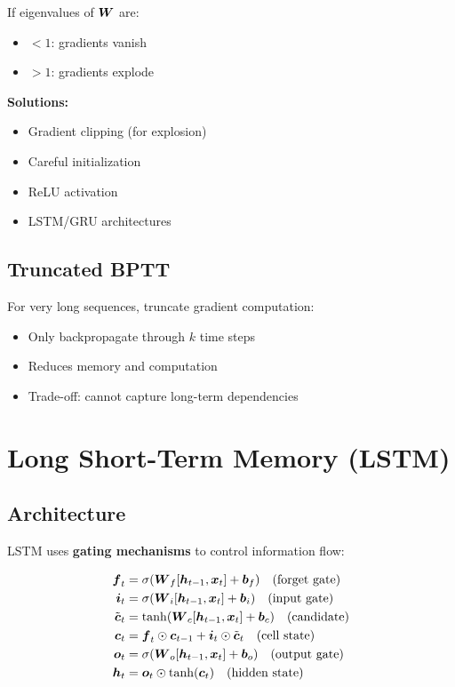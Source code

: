 If eigenvalues of $\boldsymbol{W}$ are:
\begin{itemize}
    \item $< 1$: gradients vanish
    \item $> 1$: gradients explode
\end{itemize}

\textbf{Solutions:}
\begin{itemize}
    \item Gradient clipping (for explosion)
    \item Careful initialization
    \item ReLU activation
    \item LSTM/GRU architectures
\end{itemize}

\subsection{Truncated BPTT}

For very long sequences, truncate gradient computation:
\begin{itemize}
    \item Only backpropagate through $k$ time steps
    \item Reduces memory and computation
    \item Trade-off: cannot capture long-term dependencies
\end{itemize}

\section{Long Short-Term Memory (LSTM)}
\label{sec:lstm}

\subsection{Architecture}

LSTM uses \textbf{gating mechanisms} to control information flow:

\begin{align}
\boldsymbol{f}_t &= \sigma(\boldsymbol{W}_f [\boldsymbol{h}_{t-1}, \boldsymbol{x}_t] + \boldsymbol{b}_f) \quad \text{(forget gate)} \\
\boldsymbol{i}_t &= \sigma(\boldsymbol{W}_i [\boldsymbol{h}_{t-1}, \boldsymbol{x}_t] + \boldsymbol{b}_i) \quad \text{(input gate)} \\
\tilde{\boldsymbol{c}}_t &= \tanh(\boldsymbol{W}_c [\boldsymbol{h}_{t-1}, \boldsymbol{x}_t] + \boldsymbol{b}_c) \quad \text{(candidate)} \\
\boldsymbol{c}_t &= \boldsymbol{f}_t \odot \boldsymbol{c}_{t-1} + \boldsymbol{i}_t \odot \tilde{\boldsymbol{c}}_t \quad \text{(cell state)} \\
\boldsymbol{o}_t &= \sigma(\boldsymbol{W}_o [\boldsymbol{h}_{t-1}, \boldsymbol{x}_t] + \boldsymbol{b}_o) \quad \text{(output gate)} \\
\boldsymbol{h}_t &= \boldsymbol{o}_t \odot \tanh(\boldsymbol{c}_t) \quad \text{(hidden state)}
\end{align}

